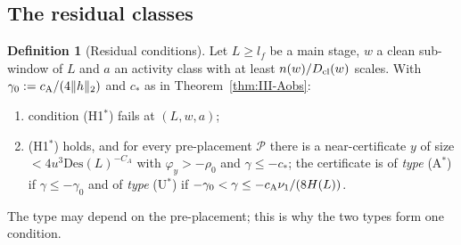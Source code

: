 \documentclass[10pt]{amsart}
\theoremstyle{definition}
\newtheorem{definition}[theorem]{Definition}
\theoremstyle{remark}
\begin{document}
\subsection{The residual classes}\label{subsec:III-residual}

\begin{definition}[Residual conditions]\label{def:III-residual}
Let $L\ge l_f$ be a main stage, $w$ a clean sub-window of $L$ and $a$ an
activity class with at least $n(w)/D_{\rm cl}(w)$ scales.  With
$\gamma_0:=c_{\rm A}/(4\|h\|_2)$ and $c_*$ as in Theorem~\ref{thm:III-Aobs}:
\begin{enumerate}
\item[(W$^*$)] condition (H1$^*$) fails at $(L,w,a)$;
\item[(A$^*$/U$^*$)] (H1$^*$) holds, and for every pre-placement $\mathcal P$
there is a near-certificate $y$ of size $<4u^3\mathrm{Des}(L)^{-C_A}$ with
$\varphi_y>-\rho_0$ and $\gamma\le-c_*$; the certificate is of \emph{type}
\textup{(A$^*$)} if $\gamma\le-\gamma_0$ and of \emph{type} \textup{(U$^*$)} if
$-\gamma_0<\gamma\le-c_{\rm A}\nu_1/(8H(L))$.
\end{enumerate}
The type may depend on the pre-placement; this is why the two types form one
condition.
\end{definition}
\end{document}
